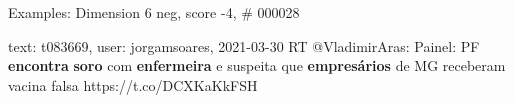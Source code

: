 \begin{frame}{Examples: Dimension 6 neg, score -4, \# 000028}
\footnotesize
\begin{alertblock}{text: t083669, user: jorgamsoares, 2021-03-30}
RT @VladimirAras: Painel: PF \textbf{encontra} \textbf{soro} com 
\textbf{enfermeira} e suspeita que \textbf{empresários} de MG receberam vacina 
falsa https://t.co/DCXKaKkFSH 
\end{alertblock}
\end{frame}
